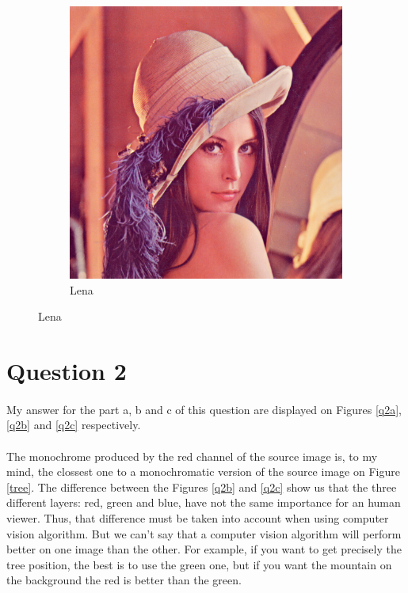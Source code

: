 \documentclass[a4paper,11pt]{article}
\begin{document}
\begin{figure}[h!]
\begin{center}
\begin{subfigure}[t]{0.45\textwidth}
      \includegraphics[width=0.9\linewidth]{Images/ps0-1-a-2.png}
      \caption{Lena}
      \label{lena}
    \end{subfigure}
  \end{center}
\end{figure}

\section{Question 2}

\paragraph{}
My answer for the part a, b and c of this question are displayed on Figures \ref{q2a}, \ref{q2b} and \ref{q2c} respectively.

\paragraph{}
The monochrome produced by the red channel of the source image is, to my mind, the clossest one to a monochromatic version of the source image on Figure \ref{tree}. The difference between the Figures \ref{q2b} and \ref{q2c} show us that the three different layers: red, green and blue, have not the same importance for an human viewer. Thus, that difference must be taken into account when using computer vision algorithm. But we can't say that a computer vision algorithm will perform better on one image than the other. For example, if you want to get precisely the tree position, the best is to use the green one, but if you want the mountain on the background the red is better than the green.
\end{document}
